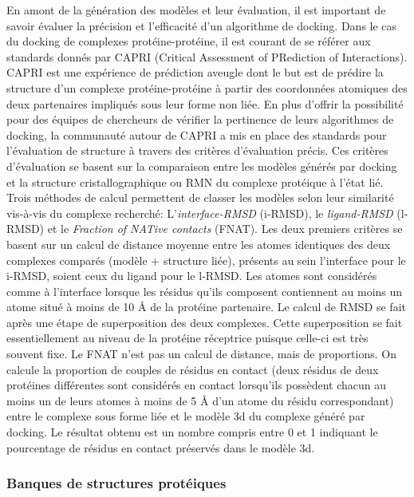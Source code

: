 En amont de la génération des modèles et leur évaluation, il est important de savoir évaluer la précision et l'efficacité d'un algorithme de docking. Dans le cas du docking de complexes protéine-protéine, il est courant de se référer aux standards donnés par CAPRI (Critical Assessment of PRediction of Interactions). CAPRI est une expérience de prédiction aveugle dont le but est de prédire la structure d'un complexe protéine-protéine à partir des coordonnées atomiques des deux partenaires impliqués sous leur forme non liée. En plus d'offrir la possibilité pour des équipes de chercheurs de vérifier la pertinence de leurs algorithmes de docking, la communauté autour de CAPRI a mis en place des standards pour l'évaluation de structure à travers des critères d'évaluation précis. Ces critères d'évaluation se basent sur la comparaison entre les modèles générés par docking et la structure cristallographique ou RMN du complexe protéique à l'état lié. Trois méthodes de calcul permettent de classer les modèles selon leur similarité vis-à-vis du complexe recherché: L'\textit{interface-RMSD} (i-RMSD), le \textit{ligand-RMSD} (l-RMSD) et le \textit{Fraction of NATive contacts} (FNAT). Les deux premiers critères se basent sur un calcul de distance moyenne entre les atomes identiques des deux complexes comparés (modèle + structure liée), présents au sein l'interface pour le i-RMSD, soient ceux du ligand pour le l-RMSD. Les atomes sont considérés comme à l'interface lorsque les résidus qu'ils composent contiennent au moins un atome situé à moins de 10 \r{A} de la protéine partenaire. Le calcul de RMSD se fait après une étape de superposition des deux complexes. Cette superposition se fait essentiellement au niveau de la protéine réceptrice puisque celle-ci est très souvent fixe. Le FNAT n'est pas un calcul de distance, mais de proportions. On calcule la proportion de couples de résidus en contact (deux résidus de deux protéines différentes sont considérés en contact lorsqu'ils possèdent chacun au moins un de leurs atomes à moins de 5 \r{A} d'un atome du résidu correspondant) entre le complexe sous forme liée et le modèle 3d du complexe généré par docking. Le résultat obtenu est un nombre compris entre 0 et 1 indiquant le pourcentage de résidus en contact préservés dans le modèle 3d.


\subsubsection{Banques de structures protéiques} \label{protein_DB}

